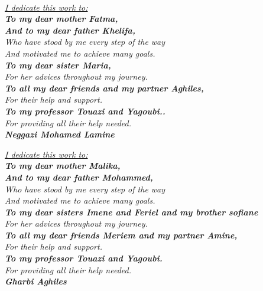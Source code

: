 \vspace*{0.1in}

\thispagestyle{empty}

\let\clearpage\relax

\begin{center}
    \textit{\fontsize{34}{46}{\bfseries{\color{Black}{Dedication}}}}
    \\
    \vspace{0.2in}
    \itshape
    \Large{\underline{I dedicate this work to:}}\\          \textbf{\large{To my dear mother Fatma,}}\\\vspace{-0.1in}
    \textbf{\large{And to my dear father Khelifa,}}\\
    \large{Who have stood by me every step of the way\\\vspace{-0.1in}And motivated me to achieve many goals.}\\
    \textbf{\large{To my dear sister Maria,}}\\
    \large{For her advices throughout my journey.}\\
    \textbf{\large{To all my dear friends and my partner Aghiles,}}\\
    \large{For their help and support.}\\
    \textbf{\large{To my professor Touazi and Yagoubi..}}\\
    \large{For providing all their help needed.}\\
    \hfill\textbf{\Large{Neggazi Mohamed Lamine}}

    \vspace{0.4in}
    \itshape
    \Large{\underline{I dedicate this work to:}}\\          \textbf{\large{To my dear mother Malika,}}\\\vspace{-0.1in}
    \textbf{\large{And to my dear father Mohammed,}}\\
    \large{Who have stood by me every step of the way\\\vspace{-0.1in}And motivated me to achieve many goals.}\\
    \textbf{\large{To my dear sisters Imene and Feriel and my brother sofiane}}\\
    \large{For her advices throughout my journey.}\\
    \textbf{\large{To all my dear friends Meriem and my partner Amine,}}\\
    \large{For their help and support.}\\
    \textbf{\large{To my professor Touazi and Yagoubi.}}\\
    \large{For providing all their help needed.}\\
    \hfill\textbf{\Large{Gharbi Aghiles}}

\end{center}


